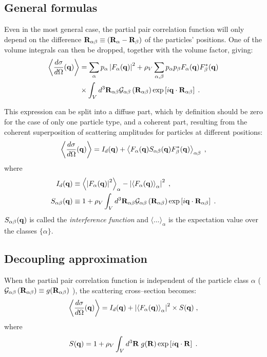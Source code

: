 \subsection{General formulas}
Even in the most general case, the partial pair correlation function will only depend on the difference $\mathbf{R}_{\alpha\beta}\equiv(\mathbf{R}_\alpha - \mathbf{R}_\beta )$ of the particles' positions. One of the volume integrals can then be dropped, together with the volume factor, giving:
\begin{align*}
  \left\langle \frac{d\sigma}{d\Omega}(\mathbf{q}) \right\rangle  & = \sum_\alpha p_\alpha \left\lvert F_\alpha(\mathbf{q})\right\rvert ^2 + \rho_V\sum_{\alpha,\beta} p_\alpha p_\beta F_\alpha (\mathbf{q})F_\beta^*(\mathbf{q}) \\
  & \times \int_V d^3\mathbf{R}_{\alpha\beta} \mathcal{G}_{\alpha \beta}\left( \mathbf{R}_{\alpha \beta} \right) \exp \left[ i\mathbf{q}\cdot \mathbf{R}_{\alpha\beta} \right] \; .
\end{align*}

This expression can be split into a diffuse part, which by definition should be zero for the case of only one particle type, and a coherent part, resulting from the coherent superposition of scattering amplitudes for particles at different positions:
\begin{equation*}
  \left\langle \frac{d\sigma}{d\Omega}(\mathbf{q}) \right\rangle = I_d(\mathbf{q}) + \left\langle F_\alpha (\mathbf{q} ) S_{\alpha\beta} (\mathbf{q}) F_\beta^* (\mathbf{q}) \right\rangle_{\alpha\beta}  \; ,
\end{equation*}
where
\begin{align*}
  I_d(\mathbf{q}) &\equiv \left\langle \left\rvert F_\alpha (\mathbf{q}) \right\rvert^2 \right\rangle_{\alpha}  - \left\lvert \left\langle  F_\alpha (\mathbf{q}) \right\rangle_{\alpha}  \right\rvert^2 \; , \\
  S_{\alpha\beta} (\mathbf{q}) &\equiv 1 + \rho_V \int_V d^3\mathbf{R}_{\alpha\beta}\mathcal{G}_{\alpha \beta}\left( \mathbf{R}_{\alpha \beta} \right) \exp \left[ i\mathbf{q}\cdot \mathbf{R}_{\alpha\beta} \right] \; .
\end{align*}
$S_{\alpha\beta} (\mathbf{q})$ is called the \emph{interference function} and $\langle\dotso\rangle_\alpha$ is the expectation value over the classes $\lbrace \alpha\rbrace$.

\subsection{Decoupling approximation}
When the partial pair correlation function is independent of the particle class $\alpha$ ($ \mathcal{G}_{\alpha \beta}\left( \mathbf{R}_{\alpha \beta} \right) \equiv g(\mathbf{R}_{\alpha\beta})$ ), the scattering cross--section becomes:
\begin{equation*}
\left\langle \frac{d\sigma}{d\Omega}(\mathbf{q}) \right\rangle  = I_d(\mathbf{q}) + \left\lvert \left\langle F_\alpha(\mathbf{q}) \right\rangle_\alpha \right\rvert ^2 \times S(\mathbf{q}) \; ,
\end{equation*}
where
\begin{equation*} 
  S(\mathbf{q}) = 1+ \rho_V \int_V d^3\mathbf{R} \; g(\mathbf{R}) \exp \left[ i\mathbf{q}\cdot \mathbf{R} \right] \; .
\end{equation*}

